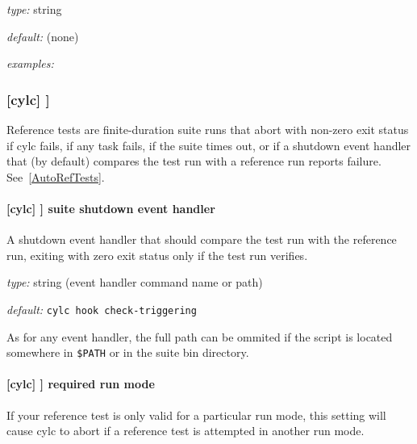 \begin{myitemize}
    \item {\em type:} string
    \item {\em default:} (none)
    \item {\em examples:}
\end{myitemize}


\subsubsection[{[[}reference test{]]}]{[cylc] \textrightarrow [[reference test]] }
\label{ReferenceTestConfig}

Reference tests are finite-duration suite runs that abort with non-zero
exit status if cylc fails, if any task fails, if the suite times
out, or if a shutdown event handler that (by default) compares the test
run with a reference run reports failure. See~\ref{AutoRefTests}.

\paragraph[suite shutdown event handler]{[cylc] \textrightarrow [[reference test]] \textrightarrow suite shutdown event handler}

A shutdown event handler that should compare the test run with the
reference run, exiting with zero exit status only if the test run
verifies.

\begin{myitemize}
    \item {\em type:} string (event handler command name or path)
    \item {\em default:} \lstinline=cylc hook check-triggering=
\end{myitemize}
As for any event handler, the full path can be ommited if the script is
located somewhere in \lstinline=$PATH= or in the suite bin directory.

\paragraph[required run mode]{[cylc] \textrightarrow [[reference test]] \textrightarrow required run mode}

If your reference test is only valid for a particular run mode, this
setting will cause cylc to abort if a reference test is attempted
in another run mode.

